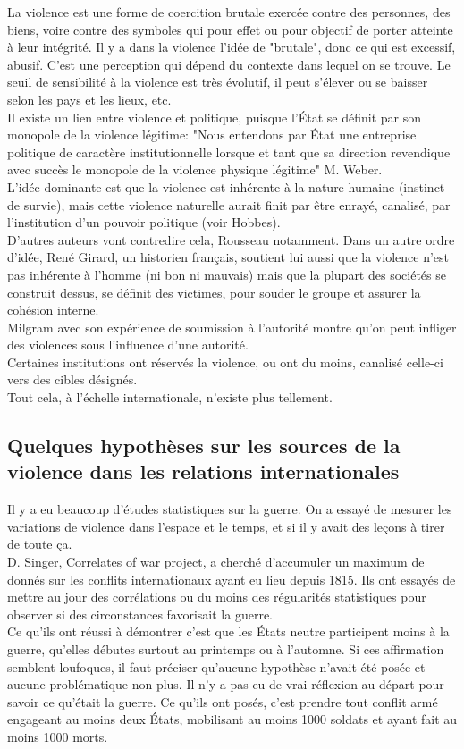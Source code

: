 \documentclass[10pt, a4paper, openany]{book}
\begin{document}
La violence est une forme de coercition brutale exercée contre des personnes, des biens, voire contre des symboles qui pour effet ou pour objectif de porter atteinte à leur intégrité. Il y a dans la violence l'idée de "brutale", donc ce qui est excessif, abusif. C'est une perception qui dépend du contexte dans lequel on se trouve. Le seuil de sensibilité à la violence est très évolutif, il peut s'élever ou se baisser selon les pays et les lieux, etc. \\
Il existe un lien entre violence et politique, puisque l'État se définit par son monopole de la violence légitime: "Nous entendons par État une entreprise politique de caractère institutionnelle lorsque et tant que sa direction revendique avec succès le monopole de la violence physique légitime" M. Weber. \\
L'idée dominante est que la violence est inhérente à la nature humaine (instinct de survie), mais cette violence naturelle aurait finit par être enrayé, canalisé, par l'institution d'un pouvoir politique (voir Hobbes). \\
D'autres auteurs vont contredire cela, Rousseau notamment. Dans un autre ordre d'idée, René Girard, un historien français, soutient lui aussi que la violence n'est pas inhérente à l'homme (ni bon ni mauvais) mais que la plupart des sociétés se construit dessus, se définit des victimes, pour souder le groupe et assurer la cohésion interne. \\
Milgram avec son expérience de soumission à l'autorité montre qu'on peut infliger des violences sous l'influence d'une autorité. \\
Certaines institutions ont réservés la violence, ou ont du moins, canalisé celle-ci vers des cibles désignés. \\
Tout cela, à l'échelle internationale, n'existe plus tellement.


\subsection{Quelques hypothèses sur les sources de la violence dans les relations internationales}

Il y a eu beaucoup d'études statistiques sur la guerre. On a essayé de mesurer les variations de violence dans l'espace et le temps, et si il y avait des leçons à tirer de toute ça. \\
D. Singer, Correlates of war project, a cherché d'accumuler un maximum de donnés sur les conflits internationaux ayant eu lieu depuis 1815. Ils ont essayés de mettre au jour des corrélations ou du moins des régularités statistiques pour observer si des circonstances favorisait la guerre. \\
Ce qu'ils ont réussi à démontrer c'est que les États neutre participent moins à la guerre, qu'elles débutes surtout au printemps ou à l'automne. Si ces affirmation semblent loufoques, il faut préciser qu'aucune hypothèse n'avait été posée et aucune problématique non plus. Il n'y a pas eu de vrai réflexion au départ pour savoir ce qu'était la guerre. Ce qu'ils ont posés, c'est prendre tout conflit armé engageant au moins deux États, mobilisant au moins 1000 soldats et ayant fait au moins 1000 morts.
\end{document}
